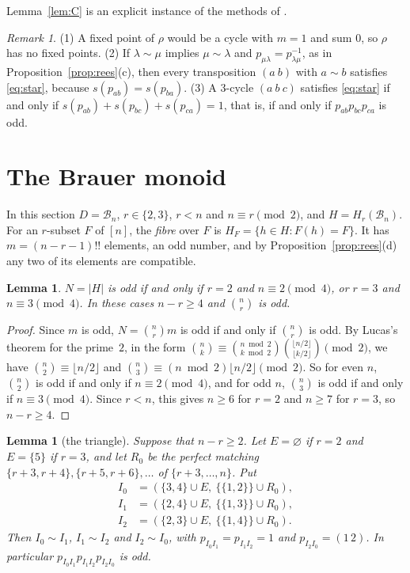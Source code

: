 \documentclass[11pt]{article}
\newtheorem{lemma}[theorem]{Lemma}
\theoremstyle{remark}
\newtheorem{remark}[theorem]{Remark}
\newcommand{\B}{\mathcal B}
\begin{document}
Lemma~\ref{lem:C} is an explicit instance of the methods of
\cite[Section~7]{abchk}.

\begin{remark}\label{rem:C}
(1) A fixed point of $\rho$ would be a cycle with $m=1$ and sum $0$, so $\rho$
has no fixed points. (2) If $\lambda\sim\mu$ implies $\mu\sim\lambda$ and
$p_{\mu\lambda}=p_{\lambda\mu}^{-1}$, as in Proposition~\ref{prop:rees}(c),
then every transposition $(a\ b)$ with $a\sim b$ satisfies \eqref{eq:star},
because $s(p_{ab})=s(p_{ba})$. (3) A $3$-cycle $(a\ b\ c)$ satisfies
\eqref{eq:star} if and only if $s(p_{ab})+s(p_{bc})+s(p_{ca})=1$, that is,
if and only if $p_{ab}p_{bc}p_{ca}$ is odd.
\end{remark}

\section{The Brauer monoid}\label{sec:odd}
In this section $D=\B_n$, $r\in\{2,3\}$, $r<n$ and $n\equiv r\pmod 2$, and
$H=H_r(\B_n)$. For an $r$-subset $F$ of $[n]$, the \emph{fibre} over $F$ is
$H_F=\{h\in H:F(h)=F\}$. It has $m=(n-r-1)!!$ elements, an odd number, and by
Proposition~\ref{prop:rees}(d) any two of its elements are compatible.

\begin{lemma}\label{lem:parity}
$N=|H|$ is odd if and only if $r=2$ and $n\equiv2\pmod4$, or $r=3$ and
$n\equiv3\pmod4$. In these cases $n-r\ge4$ and $\binom nr$ is odd.
\end{lemma}

\begin{proof}
Since $m$ is odd, $N=\binom nr m$ is odd if and only if $\binom nr$ is odd. By
Lucas's theorem for the prime~$2$, in the form
$\binom nk\equiv\binom{n\bmod2}{k\bmod2}\binom{\lfloor n/2\rfloor}{\lfloor
k/2\rfloor}\pmod2$, we have $\binom n2\equiv\lfloor n/2\rfloor$ and
$\binom n3\equiv(n\bmod2)\lfloor n/2\rfloor\pmod2$. So for even $n$,
$\binom n2$ is odd if and only if $n\equiv2\pmod4$, and for odd $n$,
$\binom n3$ is odd if and only if $n\equiv3\pmod4$. Since $r<n$, this gives
$n\ge6$ for $r=2$ and $n\ge7$ for $r=3$, so $n-r\ge4$.
\end{proof}

\begin{lemma}[the triangle]\label{lem:triangle}
Suppose that $n-r\ge2$. Let $E=\varnothing$ if $r=2$ and $E=\{5\}$ if $r=3$, and
let $R_0$ be the perfect matching $\{r+3,r+4\},\{r+5,r+6\},\dots$ of
$\{r+3,\dots,n\}$. Put
\begin{align*}
 I_0&=(\{3,4\}\cup E,\ \{\{1,2\}\}\cup R_0),\\
 I_1&=(\{2,4\}\cup E,\ \{\{1,3\}\}\cup R_0),\\
 I_2&=(\{2,3\}\cup E,\ \{\{1,4\}\}\cup R_0).
\end{align*}
Then $I_0\sim I_1$, $I_1\sim I_2$ and $I_2\sim I_0$, with
$p_{I_0I_1}=p_{I_1I_2}=1$ and $p_{I_2I_0}=(1\,2)$. In particular
$p_{I_0I_1}p_{I_1I_2}p_{I_2I_0}$ is odd.
\end{lemma}
\end{document}

